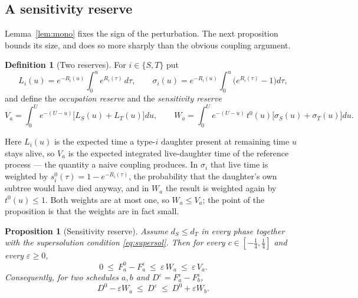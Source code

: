 \documentclass[11pt]{article}
\theoremstyle{plain}
\newtheorem{proposition}[theorem]{Proposition}
\theoremstyle{definition}
\newtheorem{definition}[theorem]{Definition}
\theoremstyle{remark}
\newcommand{\eps}{\varepsilon}
\begin{document}
\subsection{A sensitivity reserve}

Lemma~\ref{lem:mono} fixes the sign of the perturbation. The next proposition
bounds its size, and does so more sharply than the obvious coupling argument.

\begin{definition}[Two reserves]\label{def:reserves}
For $i\in\{S,T\}$ put
\begin{equation}\label{eq:sigmaL}
 L_i(u)=e^{-R_i(u)}\!\int_0^u\! e^{R_i(\tau)}\,d\tau ,
 \qquad
 \sigma_i(u)=e^{-R_i(u)}\!\int_0^u\!\bigl(e^{R_i(\tau)}-1\bigr)d\tau ,
\end{equation}
and define the \emph{occupation reserve} and the \emph{sensitivity reserve}
\begin{equation}\label{eq:VW}
 V_a=\int_0^{U}\! e^{-(U-u)}\bigl[L_S(u)+L_T(u)\bigr]du ,
 \qquad
 W_a=\int_0^{U}\! e^{-(U-u)}\,t^0(u)\bigl[\sigma_S(u)+\sigma_T(u)\bigr]du .
\end{equation}
\end{definition}

Here $L_i(u)$ is the expected time a type-$i$ daughter present at remaining
time $u$ stays alive, so $V_a$ is the expected integrated live-daughter time of
the reference process --- the quantity a naive coupling produces. In
$\sigma_i$ that live time is weighted by $s_i^0(\tau)=1-e^{-R_i(\tau)}$, the
probability that the daughter's own subtree would have died anyway, and in
$W_a$ the result is weighted again by $t^0(u)\le1$. Both weights are at most
one, so $W_a\le V_a$; the point of the proposition is that the weights are in
fact small.

\begin{proposition}[Sensitivity reserve]\label{prop:reserve}
Assume $d_S\le d_T$ in every phase together with the supersolution condition
\eqref{eq:supersol}. Then for every $c\in[-\tfrac14,\tfrac14]$ and every
$\eps\ge0$,
\begin{equation}\label{eq:reserve}
 0\ \le\ F^0_a-F^{\eps}_a\ \le\ \eps\,W_a\ \le\ \eps\,V_a .
\end{equation}
Consequently, for two schedules $a,b$ and $D^{\eps}=F^{\eps}_a-F^{\eps}_b$,
\begin{equation}\label{eq:contrast-band}
 D^{0}-\eps W_a\ \le\ D^{\eps}\ \le\ D^{0}+\eps W_b .
\end{equation}
\end{proposition}
\end{document}
